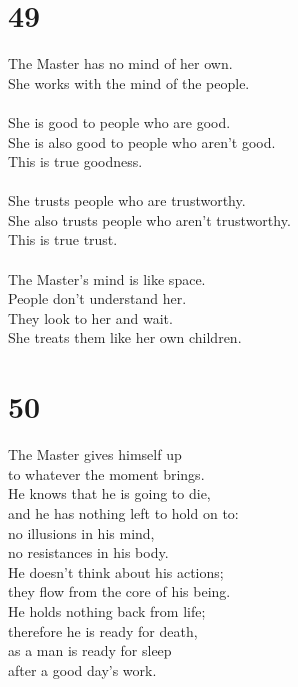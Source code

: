 \documentclass[b5paper, 12pt, oneside]{book}
\begin{document}
\chapter*{49}
The Master has no mind of her own.\\
She works with the mind of the people.\\
\\
She is good to people who are good.\\
She is also good to people who aren't good.\\
This is true goodness.\\
\\
She trusts people who are trustworthy.\\
She also trusts people who aren't trustworthy.\\
This is true trust.\\
\\
The Master's mind is like space.\\
People don't understand her.\\
They look to her and wait.\\
She treats them like her own children.\\

\chapter*{50}
The Master gives himself up\\
to whatever the moment brings.\\
He knows that he is going to die,\\
and he has nothing left to hold on to:\\
no illusions in his mind,\\
no resistances in his body.\\
He doesn't think about his actions;\\
they flow from the core of his being.\\
He holds nothing back from life;\\
therefore he is ready for death,\\
as a man is ready for sleep\\
after a good day's work.\\
\end{document}
